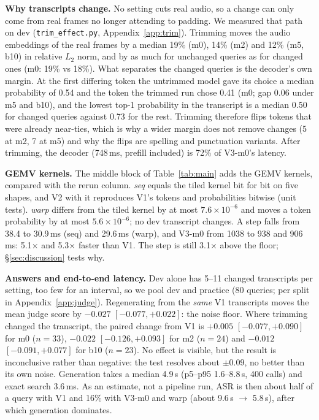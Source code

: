 \documentclass{article}
\begin{document}
\textbf{Why transcripts change.} No setting cuts real audio, so a change can only come
from real frames no longer attending to padding. We measured that path on dev
(\texttt{trim\_effect.py}, Appendix~\ref{app:trim}). Trimming moves the audio embeddings
of the real frames by a median 19\% (m0), 14\% (m2) and 12\% (m5, b10) in relative $L_2$
norm, and by as much for unchanged queries as for changed ones (m0: 19\% vs 18\%). What
separates the changed queries is the decoder's own margin. At the first differing token
the untrimmed model gave its choice a median probability of 0.54 and the token the
trimmed run chose 0.41 (m0; gap 0.06 under m5 and b10), and the lowest top-1
probability in the transcript is a median 0.50 for changed queries against 0.73 for the
rest. Trimming therefore flips tokens that were already near-ties, which is why a wider
margin does not remove changes (5 at m2, 7 at m5) and why the flips are spelling and
punctuation variants. After trimming, the decoder (748\,ms, prefill included) is 72\%
of V3-m0's latency.

\textbf{GEMV kernels.} The middle block of Table~\ref{tab:main} adds the GEMV kernels,
compared with the rerun column. \emph{seq} equals the tiled kernel bit for bit on five
shapes, and V2 with it reproduces V1's tokens and probabilities bitwise (unit tests).
\emph{warp} differs from the tiled kernel by at most $7.6{\times}10^{-6}$ and moves a
token probability by at most $5.6{\times}10^{-6}$; no dev transcript changes. A step
falls from 38.4 to 30.9\,ms (seq) and 29.6\,ms (warp), and V3-m0 from 1038 to 938 and
906\,ms: 5.1$\times$ and 5.3$\times$ faster than V1. The step is still 3.1$\times$ above
the floor; \S\ref{sec:discussion} tests why.

\textbf{Answers and end-to-end latency.} Dev alone has 5--11 changed transcripts per setting, too few for an interval, so we pool
dev and practice (80 queries; per split in Appendix~\ref{app:judge}). Regenerating from
the \emph{same} V1 transcripts moves the mean judge score by $-0.027$
$[-0.077, +0.022]$: the noise floor. Where trimming changed the transcript, the paired
change from V1 is $+0.005$ $[-0.077, +0.090]$ for m0 ($n=33$), $-0.022$
$[-0.126, +0.093]$ for m2 ($n=24$) and $-0.012$ $[-0.091, +0.077]$ for b10 ($n=23$).
No effect is visible, but the result is inconclusive rather than negative: the test
resolves about $\pm0.09$, no better than its own noise. Generation takes a median
4.9\,s (p5--p95 1.6--8.8\,s, 400 calls) and exact search 3.6\,ms. As an estimate, not
a pipeline run, ASR is then about half of a query with V1 and 16\% with V3-m0
and warp (about 9.6\,s $\to$ 5.8\,s), after which generation dominates.
\end{document}
